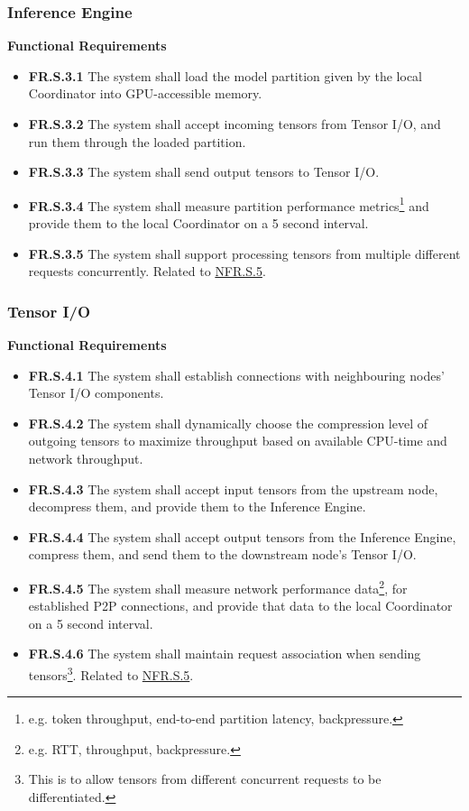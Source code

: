 \documentclass[12pt]{article}
\begin{document}
\subsubsection{Inference Engine}
\textbf{Functional Requirements}
\begin{itemize}
	\item \label{FR.S.3.1}\textbf{FR.S.3.1} The system shall load the model partition given by the local Coordinator into
		GPU-accessible memory.
	\item \label{FR.S.3.2}\textbf{FR.S.3.2} The system shall accept incoming tensors from Tensor I/O, and run them
		through the loaded partition.
	\item \label{FR.S.3.3}\textbf{FR.S.3.3} The system shall send output tensors to Tensor I/O.
	\item \label{FR.S.3.4}\textbf{FR.S.3.4} The system shall measure partition performance
		metrics\footnote{e.g. token throughput, end-to-end partition latency, backpressure.} and provide them to the local
		Coordinator on a 5 second interval.
	\item \label{FR.S.3.5}\textbf{FR.S.3.5} The system shall support processing tensors from multiple different
		requests concurrently. Related to \hyperref[NFR.S.5]{NFR.S.5}.
\end{itemize}

\subsubsection{Tensor I/O}
\textbf{Functional Requirements}
\begin{itemize}
	\item \label{FR.S.4.1}\textbf{FR.S.4.1} The system shall establish connections with neighbouring nodes' Tensor I/O components.
	\item \label{FR.S.4.2}\textbf{FR.S.4.2} The system shall dynamically choose the compression level of
		outgoing tensors to maximize throughput based on available CPU-time and network throughput.
	\item \label{FR.S.4.3}\textbf{FR.S.4.3} The system shall accept input tensors from the upstream node, decompress them,
		and provide them to the Inference Engine.
	\item \label{FR.S.4.4}\textbf{FR.S.4.4} The system shall accept output tensors from the Inference Engine, compress
		them, and send them to the downstream node's Tensor I/O.
	\item \label{FR.S.4.5}\textbf{FR.S.4.5} The system shall measure network performance
		data\footnote{e.g. RTT, throughput, backpressure.}, for established P2P connections, and provide
		that data to the local Coordinator on a 5 second interval.
	\item \label{FR.S.4.6}\textbf{FR.S.4.6} The system shall maintain request association when sending
		tensors\footnote{This is to allow tensors from different concurrent requests to be differentiated.}.
		Related to \hyperref[NFR.S.5]{NFR.S.5}.
\end{itemize}
\end{document}
